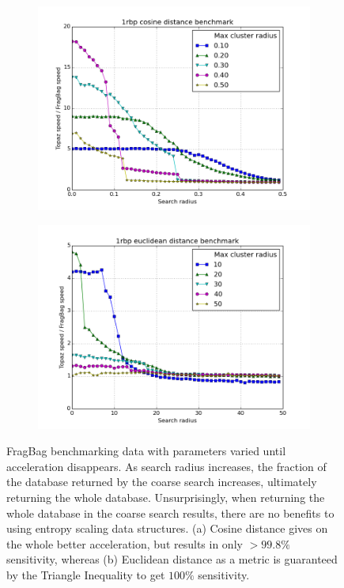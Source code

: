 \documentclass[review,preprint,12pt]{elsarticle}
\theoremstyle{definition}
\theoremstyle{remark}
\numberwithin{equation}{section}
\begin{document}
\begin{figure}[tbp]
\begin{subfigure}[b]{0.40\textwidth}
        \includegraphics[width=1\textwidth]{assets/1rbp_cosine.png}
    \end{subfigure}%
    \begin{subfigure}[b]{0.40\textwidth}
        \includegraphics[width=1\textwidth]{assets/1rbp_euclid.png}
    \end{subfigure}
    \caption{FragBag benchmarking data with parameters varied until acceleration disappears. As search radius increases, the fraction of the database returned by the coarse search increases, ultimately returning the whole database. Unsurprisingly, when returning the whole database in the coarse search results, there are no benefits to using entropy scaling data structures. (a) Cosine distance gives on the whole better acceleration, but results in only $>99.8\%$ sensitivity, whereas (b) Euclidean distance as a metric is guaranteed by the Triangle Inequality to get $100\%$ sensitivity.}
    \label{fig:fragbag}
\end{figure}
\end{document}
